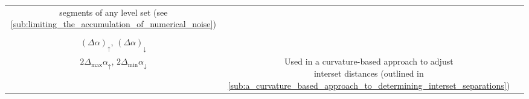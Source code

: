 \begin{table}[htpb]
\begin{tabular}{ccc}
{        segments of any level set (see
        \cref{sub:limiting_the_accumulation_of_numerical_noise})}
        \\[9pt]
        \makecell[c]{$\alpha_{\uparrow}$, $\alpha_{\downarrow}$ \\[1.5pt]%
        ${(\Delta\alpha)}_{\uparrow}$, ${(\Delta\alpha)}_{\downarrow}$} &
        \makecell[c]{$5\si{\degree}$, $25\si{\degree}$\\[1.5pt]%
        $2\Delta_{\max}\alpha_{\uparrow}$, $2\Delta_{\min}\alpha_{\downarrow}$}%
        & \makecell[c]{Used in a curvature-based approach to adjust\\
        interset distances (outlined in
    \cref{sub:a_curvature_based_approach_to_determining_interset_separations})}\\
        \bottomrule
    \end{tabular}
\end{table}

